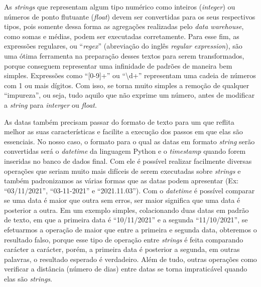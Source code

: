 As \textit{strings} que representam algum tipo numérico como inteiros (\textit{integer}) ou números de ponto flutuante (\textit{float}) devem ser convertidas para os seus respectivos tipos, pois somente dessa forma as agregações realizadas pelo \textit{data warehouse}, como somas e médias, podem ser executadas corretamente. Para esse fim, as expressões regulares, ou \enquote{\textit{regex}} (abreviação do inglês \textit{regular expression}), são uma ótima ferramenta na preparação desses textos para serem transformados, porque conseguem representar uma infinidade de padrões de maneira bem simples. Expressões como \enquote{[0-9]+} ou \enquote{\textbackslash d+} representam uma cadeia de números com 1 ou mais dígitos. Com isso, se torna muito simples a remoção de qualquer \enquote{impureza}, ou seja, tudo aquilo que não exprime um número, antes de modificar a \textit{string} para \textit{interger} ou \textit{float}.

As datas também precisam passar do formato de texto para um que reflita melhor as suas características e facilite a execução dos passos em que elas são essenciais. No nosso caso, o formato para o qual as datas em formato \textit{string} serão convertidas será o \textit{datetime} da linguagem Python e o \textit{timestamp} quando forem inseridas no banco de dados final. Com ele é possível realizar facilmente diversas operações que seriam muito mais difíceis de serem executadas sobre \textit{strings} e também padronizamos as várias formas que as datas podem apresentar (Ex: \enquote{03/11/2021}, \enquote{03-11-2021} e \enquote{2021.11.03}). Com o \textit{datetime} é possível comparar se uma data é maior que outra sem erros, ser maior significa que uma data é posterior a outra. Em um exemplo simples, colacionando duas datas em padrão de texto, em que a primeira data é \enquote{10/11/2021} e a segunda \enquote{11/10/2021}, se efetuarmos a operação de maior que entre a primeira e segunda data, obteremos o resultado falso, porque esse tipo de operação entre \textit{strings} é feita comparando carácter a carácter, porém, a primeira data é posterior a segunda, em outras palavras, o resultado esperado é verdadeiro. Além de tudo, outras operações como verificar a distância (número de dias) entre datas se torna impraticável quando elas são \textit{strings}.

